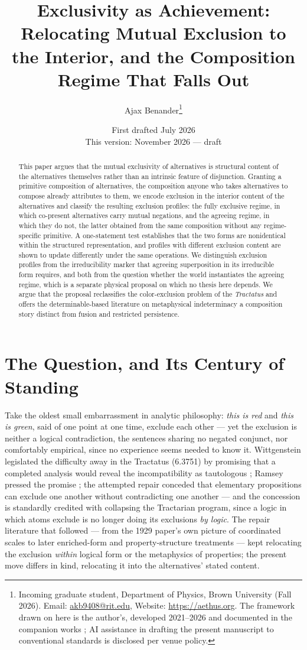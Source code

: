 \documentclass[11pt]{article}
\title{Exclusivity as Achievement:\\ \large Relocating Mutual Exclusion to the Interior, and the Composition Regime That Falls Out}
\author{Ajax Benander\thanks{Incoming graduate student, Department of Physics, Brown University (Fall 2026). Email: \href{mailto:akb9408@rit.edu}{akb9408@rit.edu}, Website: \url{https://aethus.org}. The framework drawn on here is the author's, developed 2021--2026 and documented in the companion works \cite{AethusBrief, Aethus}; AI assistance in drafting the present manuscript to conventional standards is disclosed per venue policy.}}
\date{First drafted July 2026\\ {\small This version: November 2026 --- draft}}
\begin{document}
\maketitle

\begin{abstract}
This paper argues that the mutual exclusivity of alternatives is structural content of the alternatives themselves rather than an intrinsic feature of disjunction. Granting a primitive composition of alternatives, the composition anyone who takes alternatives to compose already attributes to them, we encode exclusion in the interior content of the alternatives and classify the resulting exclusion profiles: the fully exclusive regime, in which co-present alternatives carry mutual negations, and the agreeing regime, in which they do not, the latter obtained from the same composition without any regime-specific primitive. A one-statement test establishes that the two forms are nonidentical within the structured representation, and profiles with different exclusion content are shown to update differently under the same operations. We distinguish exclusion profiles from the irreducibility marker that agreeing superposition in its irreducible form requires, and both from the question whether the world instantiates the agreeing regime, which is a separate physical proposal on which no thesis here depends. We argue that the proposal reclassifies the color-exclusion problem of the \emph{Tractatus} and offers the determinable-based literature on metaphysical indeterminacy a composition story distinct from fusion and restricted persistence.
\end{abstract}

\section{The Question, and Its Century of Standing}\label{sec:intro}
Take the oldest small embarrassment in analytic philosophy: \emph{this is red} and \emph{this is green}, said of one point at one time, exclude each other --- yet the exclusion is neither a logical contradiction, the sentences sharing no negated conjunct, nor comfortably empirical, since no experience seems needed to know it. Wittgenstein legislated the difficulty away in the Tractatus (6.3751) by promising that a completed analysis would reveal the incompatibility as tautologous \parencite{wittgenstein1921}; Ramsey pressed the promise \parencite{ramsey1923}; the attempted repair \parencite{wittgenstein1929} conceded that elementary propositions can exclude one another without contradicting one another --- and the concession is standardly credited with collapsing the Tractarian program, since a logic in which atoms exclude is no longer doing its exclusions \emph{by logic}. The repair literature that followed --- from the 1929 paper's own picture of coordinated scales to later enriched-form and property-structure treatments --- kept relocating the exclusion \emph{within} logical form or the metaphysics of properties; the present move differs in kind, relocating it into the alternatives' stated content.
\end{document}
